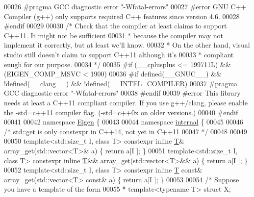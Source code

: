 \begin{DoxyCode}
00026 \textcolor{preprocessor}{#pragma GCC diagnostic error "-Wfatal-errors"}
00027 \textcolor{preprocessor}{#error GNU C++ Compiler (g++) only supports required C++ features since version 4.6.}
00028 \textcolor{preprocessor}{#endif}
00029 
00030 \textcolor{comment}{/* Check that the compiler at least claims to support C++11. It might not be sufficient}
00031 \textcolor{comment}{ * because the compiler may not implement it correctly, but at least we'll know.}
00032 \textcolor{comment}{ * On the other hand, visual studio still doesn't claim to support C++11 although it's}
00033 \textcolor{comment}{ * compliant enugh for our purpose.}
00034 \textcolor{comment}{ */}
00035 \textcolor{preprocessor}{#if (\_\_cplusplus <= 199711L) && (EIGEN\_COMP\_MSVC < 1900)}
00036 \textcolor{preprocessor}{#if defined(\_\_GNUC\_\_) && !defined(\_\_clang\_\_) && !defined(\_\_INTEL\_COMPILER)}
00037 \textcolor{preprocessor}{#pragma GCC diagnostic error "-Wfatal-errors"}
00038 \textcolor{preprocessor}{#endif}
00039 \textcolor{preprocessor}{#error This library needs at least a C++11 compliant compiler. If you use g++/clang, please enable the
       -std=c++11 compiler flag. (-std=c++0x on older versions.)}
00040 \textcolor{preprocessor}{#endif}
00041 
00042 \textcolor{keyword}{namespace }\hyperlink{namespace_eigen}{Eigen} \{
00043 
00044 \textcolor{keyword}{namespace }\hyperlink{namespaceinternal}{internal} \{
00045 
00046 \textcolor{comment}{/* std::get is only constexpr in C++14, not yet in C++11}
00047 \textcolor{comment}{ */}
00048 
00049 
00050 \textcolor{keyword}{template}<std::\textcolor{keywordtype}{size\_t} I, \textcolor{keyword}{class} T> constexpr \textcolor{keyword}{inline} \hyperlink{group___sparse_core___module_class_eigen_1_1_triplet}{T}&       array\_get(std::vector<T>&       a) \{ \textcolor{keywordflow}{return} a[I
      ]; \}
00051 \textcolor{keyword}{template}<std::\textcolor{keywordtype}{size\_t} I, \textcolor{keyword}{class} T> constexpr \textcolor{keyword}{inline} \hyperlink{group___sparse_core___module_class_eigen_1_1_triplet}{T}&&      array\_get(std::vector<T>&&      a) \{ \textcolor{keywordflow}{return} a[I
      ]; \}
00052 \textcolor{keyword}{template}<std::\textcolor{keywordtype}{size\_t} I, \textcolor{keyword}{class} T> constexpr \textcolor{keyword}{inline} \hyperlink{group___sparse_core___module_class_eigen_1_1_triplet}{T} \textcolor{keyword}{const}& array\_get(std::vector<T> \textcolor{keyword}{const}& a) \{ \textcolor{keywordflow}{return} a[I
      ]; \}
00053 
00054 \textcolor{comment}{/* Suppose you have a template of the form}
00055 \textcolor{comment}{ * template<typename T> struct X;}

\end{DoxyCode}
